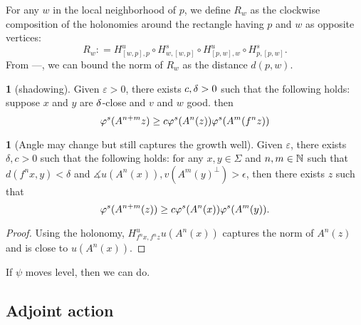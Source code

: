 \documentclass[11pt,oneside,reqno]{amsart}
\numberwithin{equation}{section}
\numberwithin{figure}{section}
\theoremstyle{definition}
\theoremstyle{definition}
\theoremstyle{definition}
\theoremstyle{definition}
\newtheorem{lem}[thm]{\protect\lemmaname}
\theoremstyle{remark}
\theoremstyle{definition}
\theoremstyle{definition}
\theoremstyle{definition}
\def\ep{\varepsilon}
\def\mangle{\measuredangle}
\providecommand{\lemmaname}{Lemma}
\begin{document}
For any $w$ in the local neighborhood of $p$, we define $R_w$ as the clockwise composition of the holonomies around the rectangle having $p$ and $w$ as opposite vertices:
$$R_w : = H^u_{[w,p],p}\circ H^s_{w,[w,p]}\circ H^u_{[p,w],w}\circ H^s_{p,[p,w]}.$$
From ---, we can bound the norm of $R_w$ as the distance $d(p,w)$.

\begin{lem}[shadowing]
Given $\ep>0$, there exists $c,\delta>0$ such that the following holds: 
suppose $x$ and $y$ are $\delta$-close and $v$ and $w$ good. then 
$$\varphi^s(A^{n+m}z) \geq c \varphi^s(A^n(z))\varphi^s(A^m(f^nz))$$
\end{lem}


\begin{lem}[Angle may change but still captures the growth well] Given $\ep$, there exists $\delta,c>0$ such that the following holds: for any $x,y \in \Sigma$ and $n,m \in \mathbb{N}$ such that $d(f^nx,y)<\delta$ and $\mangle u(A^n(x)),v(A^m(y)^\perp)>\epsilon$, then there exists $z$ such that 
$$\varphi^s(A^{n+m}(z)) \geq c \varphi^s(A^n(x))\varphi^s(A^m(y)).$$ 
\end{lem}
\begin{proof}
Using the holonomy, $H^u_{f^nx,f^nz}u(A^n(x))$ captures the norm of $A^n(z)$ and is close to $u(A^n(x))$.
\end{proof}


If $\psi$ moves level, then we can do. 


\subsection{Adjoint action}
\end{document}
